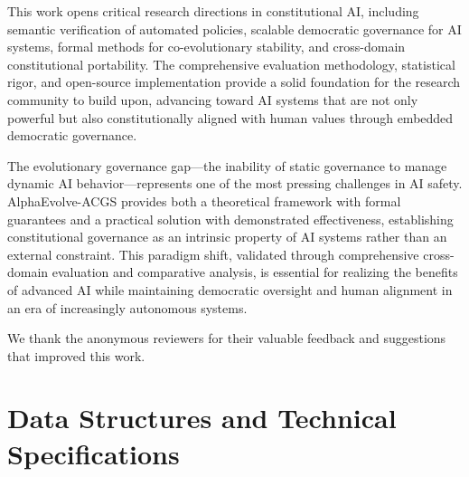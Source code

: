\documentclass[sigconf,natbib]{acmart}
\begin{document}
This work opens critical research directions in constitutional AI, including semantic verification of automated policies, scalable democratic governance for AI systems, formal methods for co-evolutionary stability, and cross-domain constitutional portability. The comprehensive evaluation methodology, statistical rigor, and open-source implementation provide a solid foundation for the research community to build upon, advancing toward AI systems that are not only powerful but also constitutionally aligned with human values through embedded democratic governance.

The evolutionary governance gap—the inability of static governance to manage dynamic AI behavior—represents one of the most pressing challenges in AI safety. AlphaEvolve-ACGS provides both a theoretical framework with formal guarantees and a practical solution with demonstrated effectiveness, establishing constitutional governance as an intrinsic property of AI systems rather than an external constraint. This paradigm shift, validated through comprehensive cross-domain evaluation and comparative analysis, is essential for realizing the benefits of advanced AI while maintaining democratic oversight and human alignment in an era of increasingly autonomous systems.

\begin{acks}
We thank the anonymous reviewers for their valuable feedback and suggestions that improved this work.
\end{acks}




\appendix

\section{Data Structures and Technical Specifications}
\label{app:data_structures}
\end{document}
